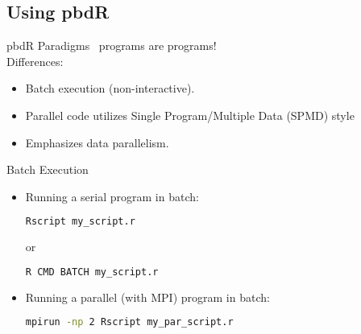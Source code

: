 \subsection{Using pbdR}
\makesubcontentsslidessec

\begin{frame}
  \begin{block}{pbdR Paradigms}
  \pbdR\ programs are \R programs!\\[.4cm]
  Differences:
  \begin{itemize}[<+-|alert@+>]
   \item Batch execution (non-interactive).
   \item Parallel code utilizes Single Program/Multiple Data (SPMD) style
   \item Emphasizes data parallelism.
   \end{itemize}
  \end{block}
\end{frame}


\begin{frame}[fragile]
  \begin{block}{Batch Execution}\pause
    \begin{itemize}
      \item Running a serial \R program in batch:
\vspace{-.4cm}
\begin{lstlisting}[language=sh]
Rscript my_script.r
\end{lstlisting}
or\vspace{-.4cm}
\begin{lstlisting}[language=sh]
R CMD BATCH my_script.r
\end{lstlisting}
      \item Running a parallel (with MPI) \R program in batch:
\vspace{-.4cm}
\begin{lstlisting}[language=sh]
mpirun -np 2 Rscript my_par_script.r
\end{lstlisting}
    \end{itemize}
  \end{block}
\end{frame}


